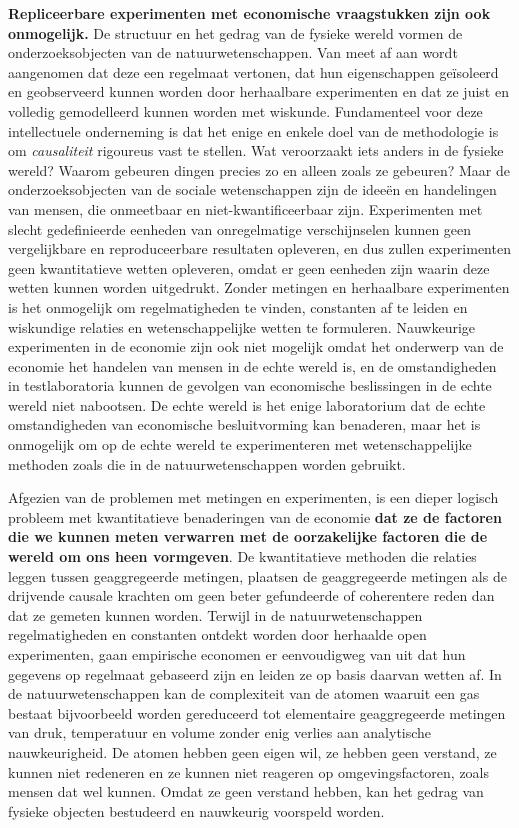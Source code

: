\documentclass[
  a5paper,
  smalldemyvopaper,11pt,twoside,onecolumn,openright,extrafontsizes,
hidelinks]{memoir}
\begin{document}
\textbf{Repliceerbare experimenten met economische vraagstukken zijn ook
onmogelijk.} De structuur en het gedrag van de fysieke wereld vormen de
onderzoeksobjecten van de natuurwetenschappen. Van meet af aan wordt
aangenomen dat deze een regelmaat vertonen, dat hun eigenschappen
geïsoleerd en geobserveerd kunnen worden door herhaalbare experimenten
en dat ze juist en volledig gemodelleerd kunnen worden met wiskunde.
Fundamenteel voor deze intellectuele onderneming is dat het enige en
enkele doel van de methodologie is om \emph{causaliteit} rigoureus vast
te stellen. Wat veroorzaakt iets anders in de fysieke wereld? Waarom
gebeuren dingen precies zo en alleen zoals ze gebeuren? Maar de
onderzoeksobjecten van de sociale wetenschappen zijn de ideeën en
handelingen van mensen, die onmeetbaar en niet-kwantificeerbaar zijn.
Experimenten met slecht gedefinieerde eenheden van onregelmatige
verschijnselen kunnen geen vergelijkbare en reproduceerbare resultaten
opleveren, en dus zullen experimenten geen kwantitatieve wetten
opleveren, omdat er geen eenheden zijn waarin deze wetten kunnen worden
uitgedrukt. Zonder metingen en herhaalbare experimenten is het
onmogelijk om regelmatigheden te vinden, constanten af te leiden en
wiskundige relaties en wetenschappelijke wetten te formuleren.
Nauwkeurige experimenten in de economie zijn ook niet mogelijk omdat het
onderwerp van de economie het handelen van mensen in de echte wereld is,
en de omstandigheden in testlaboratoria kunnen de gevolgen van
economische beslissingen in de echte wereld niet nabootsen. De echte
wereld is het enige laboratorium dat de echte omstandigheden van
economische besluitvorming kan benaderen, maar het is onmogelijk om op
de echte wereld te experimenteren met wetenschappelijke methoden zoals
die in de natuurwetenschappen worden gebruikt.

Afgezien van de problemen met metingen en experimenten, is een dieper
logisch probleem met kwantitatieve benaderingen van de economie
\textbf{dat ze de factoren die we kunnen meten verwarren met de
oorzakelijke factoren die de wereld om ons heen vormgeven}. De
kwantitatieve methoden die relaties leggen tussen geaggregeerde
metingen, plaatsen de geaggregeerde metingen als de drijvende causale
krachten om geen beter gefundeerde of coherentere reden dan dat ze
gemeten kunnen worden. Terwijl in de natuurwetenschappen regelmatigheden
en constanten ontdekt worden door herhaalde open experimenten, gaan
empirische economen er eenvoudigweg van uit dat hun gegevens op
regelmaat gebaseerd zijn en leiden ze op basis daarvan wetten af. In de
natuurwetenschappen kan de complexiteit van de atomen waaruit een gas
bestaat bijvoorbeeld worden gereduceerd tot elementaire geaggregeerde
metingen van druk, temperatuur en volume zonder enig verlies aan
analytische nauwkeurigheid. De atomen hebben geen eigen wil, ze hebben
geen verstand, ze kunnen niet redeneren en ze kunnen niet reageren op
omgevingsfactoren, zoals mensen dat wel kunnen. Omdat ze geen verstand
hebben, kan het gedrag van fysieke objecten bestudeerd en nauwkeurig
voorspeld worden.
\end{document}
